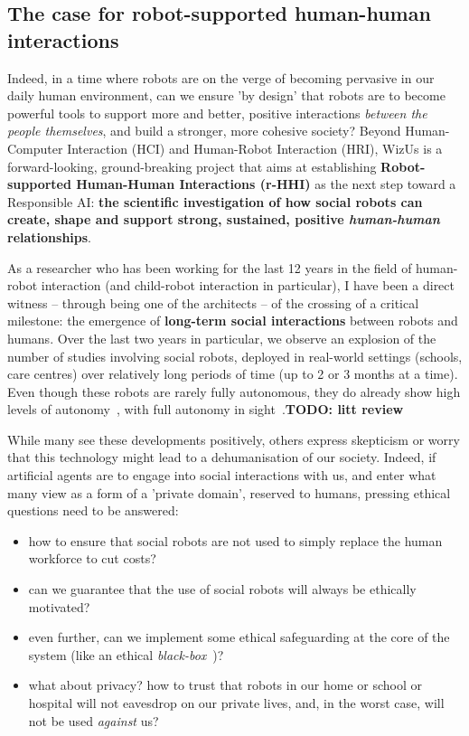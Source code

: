 \documentclass[11pt]{report}
\newcommand{\project}{WizUs\xspace}
\newcommand{\TODO}[1]{{\color{red}\textbf{TODO: #1}}}
\begin{document}
\subsection{The case for robot-supported human-human interactions}

Indeed, in a time where robots are on the verge of becoming pervasive in our
daily human environment, can we ensure 'by design' that robots are to become
powerful tools to support more and better, positive interactions \emph{between
the people themselves}, and build a stronger, more cohesive society? Beyond
Human-Computer Interaction (HCI) and Human-Robot Interaction (HRI), \project is
a forward-looking, ground-breaking project that aims at establishing
\textbf{Robot-supported Human-Human Interactions (r-HHI)} as the next step
toward a Responsible AI: \textbf{the scientific investigation of how social
robots can create, shape and support strong, sustained, positive
\emph{human-human} relationships}.

As a researcher who has been working for the last 12 years in the field of
human-robot interaction (and child-robot interaction in particular), I have been
a direct witness -- through being one of the architects -- of the crossing of a
critical milestone: the emergence of \textbf{long-term social interactions}
between robots and humans. Over the last two
years in particular, we observe an explosion of the number of studies involving
social robots, deployed in real-world settings (schools, care centres) over
relatively long periods of time (up to 2 or 3 months at a time). Even though
these robots are rarely fully autonomous, they do already show high levels of
autonomy~\cite{emmanuel}, with full autonomy in sight~\cite{strands}.\TODO{litt review}

While many see these developments positively,
others express skepticism or worry that this technology might lead to a
dehumanisation of our society. Indeed, if artificial agents are to engage into
social interactions with us, and enter what many view as a form of a 'private
domain', reserved to humans, pressing ethical questions need to be answered:

\begin{itemize}
    \item how to ensure that social robots are not used to simply replace the human
        workforce to cut costs?
    \item can we guarantee that the use of social robots will always be ethically motivated?
    \item even further, can we implement some ethical safeguarding at the core
        of the system (like an ethical \emph{black-box}~\cite{winfield2017case})?
    \item what about privacy? how to trust that robots in our home or school or
        hospital will not eavesdrop on our private lives, and, in the worst
        case, will not be used \emph{against} us?
\end{itemize}
\end{document}
